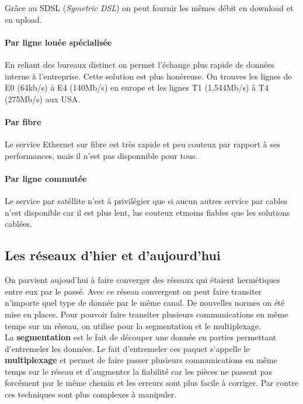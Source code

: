 \documentclass[10pt,a4paper]{article}
\begin{document}
 \smallskip

 Grâce au SDSL (\textit{Symetric DSL}) on peut fournir les mêmes débit en download et en upload.


 \paragraph{Par ligne louée spécialisée}\leavevmode

 \smallskip

 En reliant des bureaux distinct on permet l'échange plus rapide de données interne à l'entreprise. Cette solution est plus honéreuse. On trouves les lignes de E0 (64kb/s) à E4 (140Mb/s) en europe et les lignes T1 (1,544Mb/s) à T4 (275Mb/s) aux USA\@.


 \paragraph{Par fibre}\leavevmode

 \smallskip

 Le service Ethernet sur fibre est très rapide et peu couteux par rapport à ses performances, mais il n'est pas disponnible pour tous.



 \paragraph{Par ligne commutée}\leavevmode

 \smallskip

 Le service par satéllite n'est à privilégier que si aucun autres service par cables n'est disponible car il est plus lent, lus couteux etmoins fiables que les solutions cablées.

 \subsection{Les réseaux d'hier et d'aujourd'hui}

 On parvient aujoud'hui à faire converger des réseaux qui étaient hermétiques entre eux par le passé. Avec ce réseau convergent on peut faire transiter n'importe quel type de donnée par le même canal. De nouvelles normes on été mise en places. Pour pouvoir faire transiter plusieurs communications en même temps sur un réseau, on utilise pour la segmentation et le multiplexage.\\

 \indent
 La \textbf{segmentation} est le fait de découper une donnée en parties permettant d'entremeler les données. Le fait d'entremeler ces paquet s'appelle le \textbf{multiplexage} et permet de faire passer plusieurs communications en même temps sur le réseau et d'augmenter la fiabilité car les pièces ne passent pas forcément par le même chemin et les erreurs sont plus facile à corriger. Par contre ces techniques sont plus complexes à manipuler.\\
\end{document}
